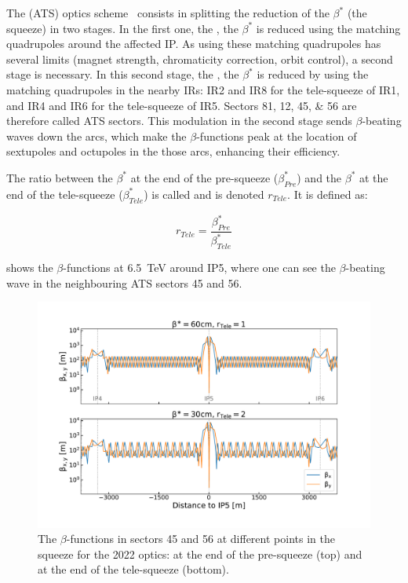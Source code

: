 The  (ATS) optics scheme~\cite{CERN:Fartoukh:ATS_Report,PRAB:Fartoukh:Achromatic_Telescopic_Squeeze,IPAC:Pojer:LHC_ATS_Experience} consists in splitting the reduction of the \(\beta^{\ast}\) (the squeeze) in two stages.
In the first one, the , the \(\beta^{\ast}\) is reduced using the matching quadrupoles around the affected IP.
As using these matching quadrupoles has several limits (magnet strength, chromaticity correction, orbit control), a second stage is necessary.
In this second stage, the , the \(\beta^{\ast}\) is reduced by using the matching quadrupoles in the nearby IRs: IR\num{2} and IR\num{8} for the tele-squeeze of IR\num{1}, and IR\num{4} and IR\num{6} for the tele-squeeze of IR\num{5}.
Sectors \numlist{81;12;45;56} are therefore called ATS sectors.
This modulation in the second stage sends \(\beta\)-beating waves down the arcs, which make the \(\beta\)-functions peak at the location of sextupoles and octupoles in the those arcs, enhancing their efficiency.

The ratio between the \(\beta^{\ast}\) at the end of the pre-squeeze (\(\beta^{\ast}_{Pre}\)) and the \(\beta^{\ast}\) at the end of the tele-squeeze (\(\beta^{\ast}_{Tele}\)) is called  and is denoted \(r_{Tele}\).
It is defined as:

\begin{equation}
  r_{Tele} = \frac{\beta^{\ast}_{Pre}}{\beta^{\ast}_{Tele}}
  \label{equation:tele_index}
\end{equation}

 shows the \(\beta\)-functions at \qty{6.5}{\tera\electronvolt} around IP\num{5}, where one can see the \(\beta\)-beating wave in the neighbouring ATS sectors \num{45} and \num{56}.

\begin{figure}[!hbt]
  \centering
  \includegraphics*[width=0.99\linewidth]{Figures/Optics_Measurements_Corrections_at_LHC/lhc_ats_wave.pdf}
  \caption{The \(\beta\)-functions in sectors \num{45} and \num{56} at different points in the squeeze for the \num{2022} optics: at the end of the pre-squeeze (top) and at the end of the tele-squeeze (bottom).}
  \label{figure:lhc_ats_scheme}
\end{figure}

